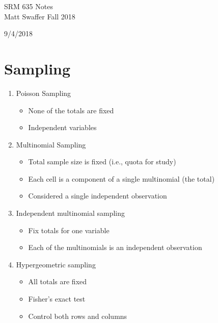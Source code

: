 \documentclass[12 pt]{article}
\begin{document}
\begin{center}
	SRM 635 Notes\\
	\color{blue}
	Matt Swaffer Fall 2018
	\color{black}
\end{center}

\begin{center}
    9/4/2018
\end{center}
\section{Sampling}
\begin{enumerate}
    \item Poisson Sampling
        \begin{itemize}
            \item None of the totals are fixed
            \item Independent variables
        \end{itemize}
    \item Multinomial Sampling
        \begin{itemize}
            \item Total sample size is fixed (i.e., quota for study)
            \item Each cell is a component of a single multinomial (the total)
            \item Considered a single independent observation
        \end{itemize}
    \item Independent multinomial sampling
        \begin{itemize}
            \item Fix totals for one variable
            \item Each of the multinomials is an independent observation
        \end{itemize}
    \item Hypergeometric sampling
        \begin{itemize}
            \item All totals are fixed
            \item Fisher's exact test
            \item Control both rows and columns
        \end{itemize}
\end{enumerate}
\end{document}
